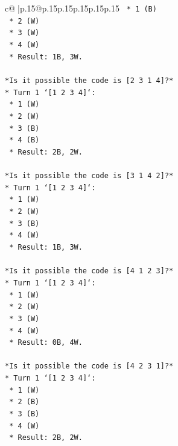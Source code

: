 \documentclass{article}
\begin{document}
{\begin{supertabular}{c@{$\;$}|p{.15\linewidth}@{}p{.15\linewidth}p{.15\linewidth}p{.15\linewidth}p{.15\linewidth}p{.15\linewidth}}
{{{\texttt{    *   1 (B)} \\
\texttt{    *   2 (W)} \\
\texttt{    *   3 (W)} \\
\texttt{    *   4 (W)} \\
\texttt{    *   Result: 1B, 3W.} \\
\\ 
\texttt{*Is it possible the code is {[}2 3 1 4{]}?*} \\
\texttt{*   Turn 1 `{[}1 2 3 4{]}`:} \\
\texttt{    *   1 (W)} \\
\texttt{    *   2 (W)} \\
\texttt{    *   3 (B)} \\
\texttt{    *   4 (B)} \\
\texttt{    *   Result: 2B, 2W.} \\
\\ 
\texttt{*Is it possible the code is {[}3 1 4 2{]}?*} \\
\texttt{*   Turn 1 `{[}1 2 3 4{]}`:} \\
\texttt{    *   1 (W)} \\
\texttt{    *   2 (W)} \\
\texttt{    *   3 (B)} \\
\texttt{    *   4 (W)} \\
\texttt{    *   Result: 1B, 3W.} \\
\\ 
\texttt{*Is it possible the code is {[}4 1 2 3{]}?*} \\
\texttt{*   Turn 1 `{[}1 2 3 4{]}`:} \\
\texttt{    *   1 (W)} \\
\texttt{    *   2 (W)} \\
\texttt{    *   3 (W)} \\
\texttt{    *   4 (W)} \\
\texttt{    *   Result: 0B, 4W.} \\
\\ 
\texttt{*Is it possible the code is {[}4 2 3 1{]}?*} \\
\texttt{*   Turn 1 `{[}1 2 3 4{]}`:} \\
\texttt{    *   1 (W)} \\
\texttt{    *   2 (B)} \\
\texttt{    *   3 (B)} \\
\texttt{    *   4 (W)} \\
\texttt{    *   Result: 2B, 2W.} \\
\\ 
}}}
\end{supertabular}}
\end{document}
